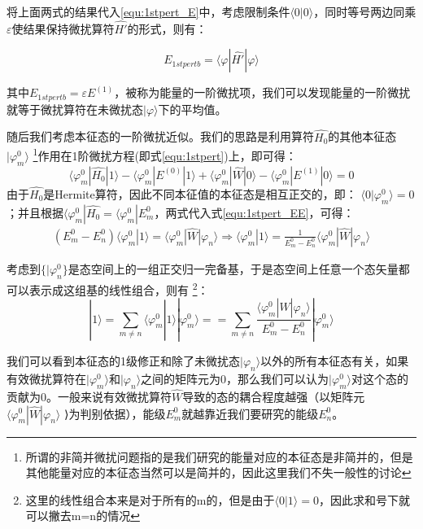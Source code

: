         将上面两式的结果代入\eqref{equ:1stpert_E}中，考虑限制条件$\langle0|0\rangle$，同时等号两边同乘$\varepsilon$使结果保持微扰算符$\hat{H'}$的形式，则有：
        
        \begin{equation}
            E_{1stpertb}=\langle\varphi|\hat{H'}|\varphi\rangle
        \end{equation}

        其中$E_{1stpertb}=\varepsilon E^{(1)}$，被称为能量的一阶微扰项，我们可以发现能量的一阶微扰就等于微扰算符在未微扰态$|\varphi\rangle$下的平均值。
        
        随后我们考虑本征态的一阶微扰近似。我们的思路是利用算符$\hat{H_0}$的其他本征态$|\varphi_m ^0\rangle$
        \footnote{所谓的非简并微扰问题指的是我们研究的能量对应的本征态是非简并的，但是其他能量对应的本征态当然可以是简并的，因此这里我们不失一般性的讨论}作用在1阶微扰方程(即式\eqref{equ:1stpert})上，即可得：
        \begin{equation} \label{equ:1stpert_EE}
             \langle\varphi_m^0|\hat{H_0}|1\rangle-\langle\varphi_m^0|E^{(0)}|1\rangle+\langle\varphi_m^0|\hat{W}|0\rangle-\langle\varphi_m^0|E^{(1)}|0\rangle=0 
        \end{equation}
        由于$\hat{H_0}$是Hermite算符，因此不同本征值的本征态是相互正交的，即：
        $\langle0|\varphi_m^0\rangle=0$；并且根据$\langle\varphi_m^0|\hat{H_0}=\langle\varphi_m^0|E_m^0$，两式代入式\eqref{equ:1stpert_EE}，可得：
        \begin{align}
                  (E_m^0-E_n^0) \langle\varphi_m^0|1\rangle=\langle\varphi_m^0|\hat{W}|\varphi_n\rangle \Rightarrow 
               \langle\varphi_m^0|1\rangle=\frac{1}{E_m^0-E_n^0}\langle\varphi_m^0|\hat{W}|\varphi_n\rangle
        \end{align}

        考虑到$\{|\varphi_n^0\}$是态空间上的一组正交归一完备基，于是态空间上任意一个态矢量都可以表示成这组基的线性组合，则有
        \footnote{这里的线性组合本来是对于所有的m的，但是由于$\langle0|1\rangle=0$，因此求和号下就可以撇去m=n的情况}：
        \begin{equation}\label{equ:1stpert_S}
            |1\rangle=\sum_{m\ne n}\langle\varphi_m^0|1\rangle|\varphi_m^0\rangle=
            =\sum_{m \ne n}\frac{\langle\varphi_m^0|\hat{W}|\varphi_n\rangle}{E_m^0-E_n^0}|\varphi_m^0\rangle
        \end{equation}
        
        我们可以看到本征态的1级修正和除了未微扰态$|\varphi_n\rangle$以外的所有本征态有关，如果有效微扰算符在$|\varphi_m^0\rangle$和$|\varphi_n\rangle$之间的矩阵元为0，那么我们可以认为$|\varphi_m^0\rangle$对这个态的贡献为0。一般来说有效微扰算符$\hat{W}$导致的态的耦合程度越强（以矩阵元$\langle\varphi_m^0|\hat{W}|\varphi_n\rangle$ ⟩为判别依据），能级$E_m^0$就越靠近我们要研究的能级$E_n^0$。
        
